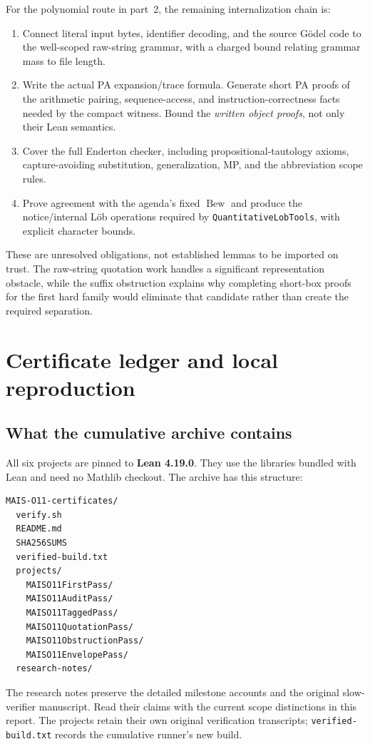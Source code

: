\documentclass[11pt]{article}
\theoremstyle{definition}
\theoremstyle{remark}
\begin{document}
For the polynomial route in part~2, the remaining internalization chain is:
\begin{enumerate}
\item Connect literal input bytes, identifier decoding, and the source
      G\"odel code to the well-scoped raw-string grammar, with a charged bound
      relating grammar mass to file length.
\item Write the actual PA expansion/trace formula. Generate short PA proofs
      of the arithmetic pairing, sequence-access, and instruction-correctness
      facts needed by the compact witness. Bound the \emph{written object
      proofs}, not only their Lean semantics.
\item Cover the full Enderton checker, including propositional-tautology
      axioms, capture-avoiding substitution, generalization, MP, and the
      abbreviation scope rules.
\item Prove agreement with the agenda's fixed $\operatorname{Bew}$ and
      produce the notice/internal L\"ob operations required by
      \texttt{QuantitativeLobTools}, with explicit character bounds.
\end{enumerate}
These are unresolved obligations, not established lemmas to be imported on
trust. The raw-string quotation work handles a significant representation
obstacle, while the suffix obstruction explains why completing short-box
proofs for the first hard family would eliminate that candidate rather than
create the required separation.

\section{Certificate ledger and local reproduction}
\label{sec:ledger}

\subsection{What the cumulative archive contains}
All six projects are pinned to \textbf{Lean 4.19.0}. They use the libraries
bundled with Lean and need no Mathlib checkout. The archive has this structure:
\begin{lstlisting}
MAIS-O11-certificates/
  verify.sh
  README.md
  SHA256SUMS
  verified-build.txt
  projects/
    MAISO11FirstPass/
    MAISO11AuditPass/
    MAISO11TaggedPass/
    MAISO11QuotationPass/
    MAISO11ObstructionPass/
    MAISO11EnvelopePass/
  research-notes/
\end{lstlisting}
The research notes preserve the detailed milestone accounts and the original
slow-verifier manuscript. Read their claims with the current scope distinctions
in this report. The projects retain their own original verification transcripts;
\texttt{verified-build.txt} records the cumulative runner's new build.
\end{document}
